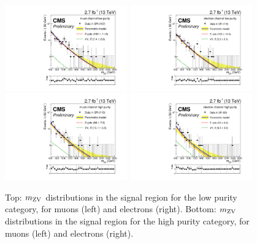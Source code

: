\begin{figure}[htbp]
\centering
\includegraphics[width=0.47\textwidth]{figures/fits/mVZsigMLP.pdf}
\includegraphics[width=0.47\textwidth]{figures/fits/mVZsigELP.pdf}\newline
\includegraphics[width=0.47\textwidth]{figures/fits/mVZsigMHP.pdf}
\includegraphics[width=0.47\textwidth]{figures/fits/mVZsigEHP.pdf}\newline
\caption[Invariant mass distributions]{
Top: $m_\mathrm{ZV}$ distributions in the signal region for the low purity category,
for muons (left) and electrons (right). 
Bottom: $m_\mathrm{ZV}$ distributions in the signal region for the high purity category,
for muons (left) and electrons (right). 
}
\label{fig:highmass_MVZ}
\end{figure}

